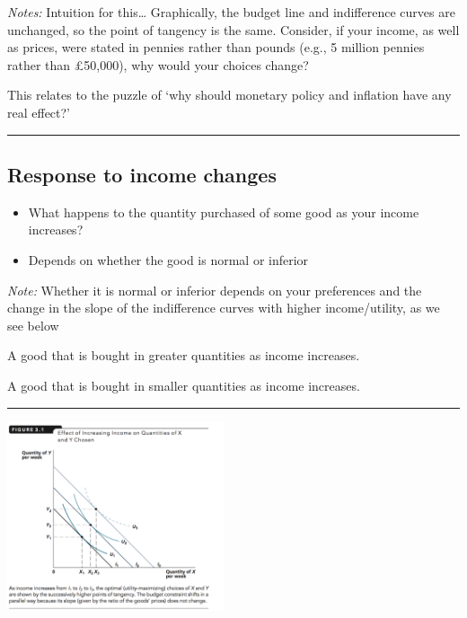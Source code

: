 \documentclass[]{article}
\providecommand{\tightlist}{%
  \setlength{\itemsep}{0pt}\setlength{\parskip}{0pt}}
\begin{document}
\emph{Notes:} Intuition for this\ldots{} Graphically, the budget line and indifference curves are unchanged, so the point of tangency is the same.
Consider, if your income, as well as prices, were stated in pennies rather than pounds (e.g., 5 million pennies rather than £50,000), why would your choices change?

This relates to the puzzle of `why should monetary policy and inflation have any real effect?'

\begin{center}\rule{0.5\linewidth}{\linethickness}\end{center}

\hypertarget{response-to-income-changes}{%
\subsection{Response to income changes}\label{response-to-income-changes}}

\begin{itemize}
\tightlist
\item
  What happens to the quantity purchased of some good as your income increases?
\item
  Depends on whether the good is normal or inferior
\end{itemize}

\emph{Note:} Whether it is normal or inferior depends on your preferences and the change in the slope of the indifference curves with higher income/utility, as we see below

\bigskip

\begin{description}
\tightlist
\item[Normal good]
A good that is bought in greater quantities as income increases.
\item[Inferior good]
A good that is bought in smaller quantities as income increases.
\end{description}

\begin{center}\rule{0.5\linewidth}{\linethickness}\end{center}

\includegraphics[height=2.2in]{picsfigs/normalgood.png}
\end{document}
